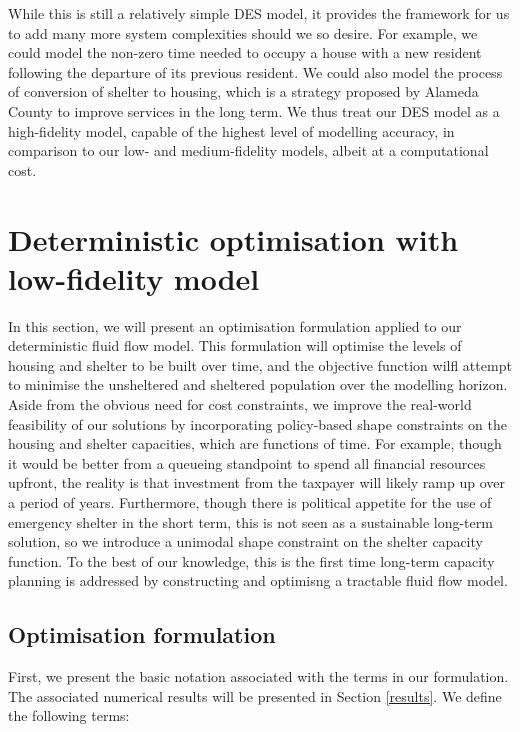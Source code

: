 \documentclass[12pt,a4paper]{article}
\begin{document}
While this is still a relatively simple DES model, it provides the framework for us to add many more system complexities should we so desire. For example, we could model the non-zero time needed to occupy a house with a new resident following the departure of its previous resident. We could also model the process of conversion of shelter to housing, which is a strategy proposed by Alameda County to improve services in the long term. We thus treat our DES model as a high-fidelity model, capable of the highest level of modelling accuracy, in comparison to our low- and medium-fidelity models, albeit at a computational cost.

\newpage

\section{Deterministic optimisation with low-fidelity model} \label{do}
%
In this section, we will present an optimisation formulation applied to our deterministic fluid flow model. This formulation will optimise the levels of housing and shelter to be built over time, and the objective function wilfl attempt to minimise the unsheltered and sheltered population over the modelling horizon. Aside from the obvious need for cost constraints, we improve the real-world feasibility of our solutions by incorporating policy-based shape constraints on the housing and shelter capacities, which are functions of time. For example, though it would be better from a queueing standpoint to spend all financial resources upfront, the reality is that investment from the taxpayer will likely ramp up over a period of years. Furthermore, though there is political appetite for the use of emergency shelter in the short term, this is not seen as a sustainable long-term solution, so we introduce a unimodal shape constraint on the shelter capacity function. To the best of our knowledge, this is the first time long-term capacity planning is addressed by constructing and optimisng a tractable fluid flow model. 
%
\subsection{Optimisation formulation} \label{opt}
%
First, we present the basic notation associated with the terms in our formulation. The associated numerical results will be presented in Section \ref{results}. We define the following terms:
\end{document}
